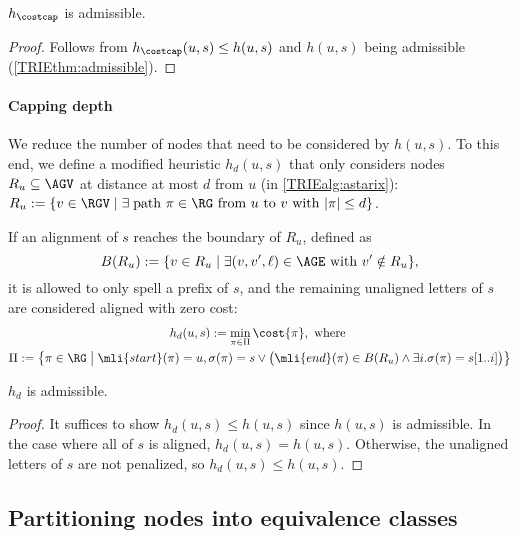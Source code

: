 \begin{samepage}
	\begin{thm} \label{TRIEthm:hcostcap_admissible}
		$h_{\costcap}$ is admissible.
	\end{thm}
	\begin{proof}
		Follows from $h_\costcap(u,s) \leq h(u,s)$ and $h(u,s)$ being admissible
		(\cref{TRIEthm:admissible}).
	\end{proof}
	\end{samepage}

\paragraph{Capping depth}
We reduce the number of nodes that need to be considered by $h(u,s)$. To this
end, we define a modified heuristic $h_d(u,s)$ that only considers nodes $R_u
\subseteq \AGV$ at distance at most $d$ from $u$ (in \cref{TRIEalg:astarix}):
$
R_u := \{ v \in \RGV \mid \exists \; \text{path } \pi \in \RG \text{ from } u \text{ to } v \text{ with } \lvert \pi \rvert \leq d \}
$.

If an alignment of $s$ reaches the boundary of $R_u$, defined as $$B(R_u) := \{v
\in R_u \mid \exists (v,v',\ell) \in \AGE \text{ with } v' \notin R_u \},$$ it is
allowed to only spell a prefix of $s$, and the remaining unaligned letters of
$s$ are considered aligned with zero cost:
\begin{gather*}
h_d(u,s) := \min_{\pi \in \Pi} \cost{\pi}, \text{ where } \\
\Pi := \left\{ \pi \in \RG \;\middle|\;
\mli{start}(\pi)=u, 
\sigma(\pi)=s \lor \big(\mli{end}(\pi)\in B(R_u) \land \exists i. \sigma(\pi)=s[1..i] \big)
\right\}
\end{gather*}

\begin{samepage}
\begin{thm} \label{TRIEthm:hbar_admissible}
	$h_d$ is admissible.
\end{thm}
\begin{proof}
	It suffices to show $h_d(u,s) \leq h(u, s)$ since $h(u, s)$ is admissible.
	In the case where all of $s$ is aligned, $h_d(u,s) = h(u, s)$. Otherwise,
	the unaligned letters of $s$ are not penalized, so $h_d(u,s) \leq h(u, s)$.
\end{proof}
\end{samepage}


\subsection{Partitioning nodes into equivalence classes} \label{TRIEsubsec:partition}

